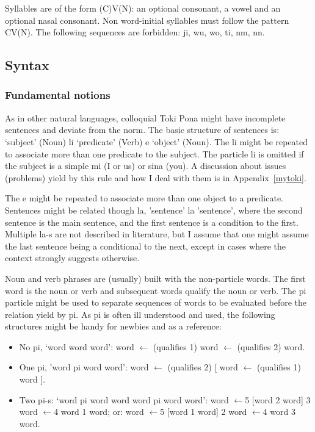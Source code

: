 \documentclass{article}
\begin{document}
Syllables are of the form (C)V(N):
an optional consonant, a vowel and an optional nasal consonant.
Non word-initial syllables must follow the pattern CV(N).
The following sequences are forbidden: ji, wu, wo, ti, nm, nn.

\subsection{Syntax}
\subsubsection{Fundamental notions}
As in other natural languages, 
colloquial Toki Pona might have
incomplete sentences and deviate from the
norm.
The basic structure of sentences is:
`subject' (Noun) li `predicate' (Verb) e `object' (Noun).
The li might be repeated to associate more than
one predicate to the subject.
The particle li is omitted if the subject is a simple mi (I or us)
or sina (you). A discussion about issues (problems)
yield by this rule
and how I deal with them is in Appendix~\ref{mytoki}.

The e might be repeated to associate more than
one object to a predicate.
Sentences might be related though la,
'sentence' la 'sentence', where the second sentence is
the main sentence, and the first sentence is a condition
to the first.
Multiple la-s are not described in literature,
but I assume that one might assume the last sentence
being a conditional to the next,
except in cases where the context strongly suggests
otherwise.

Noun and verb phrases are (usually) built with the non-particle words.
The first word is the noun or verb and subsequent words
qualify the noun or verb.
The pi particle might be used to separate sequences of words
to be evaluated before the relation yield by pi.
As pi is often ill understood and used,
the following structures might be handy for newbies and as a
reference:
\begin{itemize}
  \item No pi, `word word word':
word $\leftarrow$ (qualifies 1) word $\leftarrow$ (qualifies 2)  word.
  \item One pi, 'word pi word word': word $\leftarrow$ (qualifies 2) [
      word $\leftarrow$ (qualifies 1)  word ].
  \item Two pi-s: `word pi word word word pi word word':
    word $\leftarrow$5 [word 2 word] 3 word $\leftarrow$4 word 1  word;
or:
    word $\leftarrow$5 [word 1 word] 2 word $\leftarrow$4 word 3  word.
\end{itemize}
\end{document}
